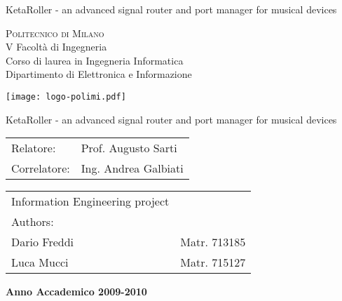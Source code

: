 KetaRoller - an advanced signal router and port manager for musical devices

\begin{center}
\Large{\textsc{Politecnico di Milano}}\\
\large{V Facolt\`a di Ingegneria}\\
\large{Corso di laurea in Ingegneria Informatica}\\
\large{Dipartimento di Elettronica e Informazione}\\
\vspace{7mm}
\begin{DoxyImage}
\texttt{[image: logo-polimi.pdf]}
\end{DoxyImage}
\vspace{2mm}

\begin{LARGE}
KetaRoller - an advanced signal router and port manager for musical devices
\end{LARGE}
\vspace{25mm}

\begin{flushleft}
\begin{tabular}{l l }
Relatore:    & Prof. Augusto Sarti\\
Correlatore: & Ing. Andrea Galbiati\\
\end{tabular}
\end{flushleft}
\vspace{25mm}

\begin{flushright}
\begin{tabular}{l l }
Information Engineering project \\
Authors: & \\
Dario Freddi & Matr. 713185 \\
Luca Mucci & Matr. 715127
\end{tabular}
\end{flushright}
\vspace{43mm}
{\large{\bf Anno Accademico 2009-2010}}
\end{center}
